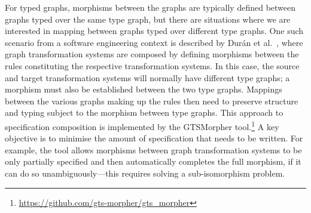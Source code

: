 \documentclass[runningheads]{llncs}
\begin{document}
For typed graphs, morphisms between the graphs are typically defined between graphs typed over the
same type graph, but there are situations where we are interested in mapping between graphs typed
over different type graphs.  One such scenario from a software engineering context is described by
Dur{\'a}n et al.~\cite{Duran+12,Duran+17}, where graph transformation systems are composed by
defining morphisms between the rules constituting the respective transformation systems.  In this
case, the source and target transformation systems will normally have different type graphs; a
morphism must also be established between the two type graphs.  Mappings between the various graphs
making up the rules then need to preserve structure and typing subject to the morphism between type
graphs. This approach to specification composition is implemented by the GTSMorpher
tool.\footnote{\url{https://github.com/gts-morpher/gts_morpher}} A key objective is to minimise the
amount of specification that needs to be written.  For example, the tool allows morphisms between
graph transformation systems to be only partially specified and then automatically completes the
full morphism, if it can do so unambiguously---this requires solving a sub-isomorphism problem.
\end{document}
